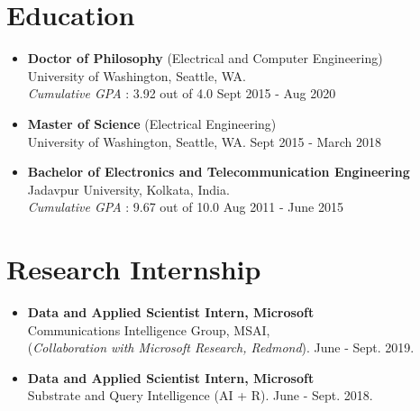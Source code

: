 \documentclass[margin,line]{resume}
\begin{document}
\begin{resume}
    \section{\mysidestyle Education}
\begin{itemize}
\vspace{-0.5pt}
\item \textbf{ {Doctor of Philosophy }} (Electrical and Computer Engineering)     \\ 
University of Washington, Seattle, WA.   \\ 
\emph{Cumulative GPA} : 3.92 out of 4.0 \hfill Sept 2015 - Aug 2020
\item \textbf{ {Master of Science }} (Electrical Engineering)     \\
University of Washington, Seattle, WA.   \hfill Sept 2015 - March 2018

\item \textbf{ {Bachelor of Electronics and Telecommunication Engineering }}     \\ 
Jadavpur University, Kolkata, India. \\                     
\emph{Cumulative GPA} : 9.67 out of 10.0 \hfill Aug 2011 - June 2015\\
\end{itemize}

\section{\mysidestyle Research Internship}
\begin{itemize}
\vspace{-4.5pt}
\item \textbf{Data and Applied Scientist Intern, Microsoft} \\  Communications Intelligence Group, MSAI, \\ (\textit{Collaboration with Microsoft Research, Redmond}). \hfill June - Sept. 2019.

\item \textbf{Data and Applied Scientist Intern, Microsoft} \\ Substrate and Query Intelligence (AI + R). \hfill June - Sept. 2018.


\end{itemize}
\end{resume}
\end{document}
